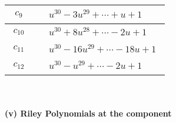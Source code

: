 \documentclass[1p]{elsarticle_modified}
\theoremstyle{definition}
\begin{document}
\begin{tabular}{m{50pt}|m{274pt}}
\hline $$\begin{aligned}c_{9}\end{aligned}$$&$\begin{aligned}
&u^{30}-3 u^{29}+\cdots+u+1
\end{aligned}$\\
\hline $$\begin{aligned}c_{10}\end{aligned}$$&$\begin{aligned}
&u^{30}+8 u^{28}+\cdots-2 u+1
\end{aligned}$\\
\hline $$\begin{aligned}c_{11}\end{aligned}$$&$\begin{aligned}
&u^{30}-16 u^{29}+\cdots-18 u+1
\end{aligned}$\\
\hline $$\begin{aligned}c_{12}\end{aligned}$$&$\begin{aligned}
&u^{30}- u^{29}+\cdots-2 u+1
\end{aligned}$\\
\hline
\end{tabular}\\~\\
\newpage\renewcommand{\arraystretch}{1}
\flushleft \textbf{(v) Riley Polynomials at the component}\newline \\
\end{document}
